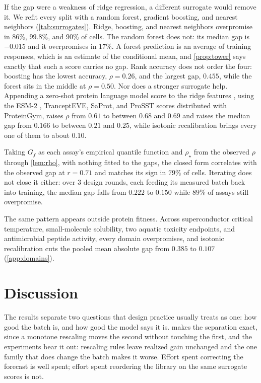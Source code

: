 \documentclass{article}
\theoremstyle{plain}
\theoremstyle{definition}
\begin{document}
If the gap were a weakness of ridge regression, a different surrogate would remove it.
We refit every split with a random forest, gradient boosting, and nearest neighbors
(\cref{tab:surrogates}). Ridge, boosting, and nearest neighbors overpromise in $86\%$,
$99.8\%$, and $90\%$ of cells. The random forest does not: its median gap is $-0.015$
and it overpromises in $17\%$. A forest prediction is an average of training responses,
which is an estimate of the conditional mean, and \cref{prop:tower} says exactly that
such a score carries no gap. Rank accuracy does not order the four: boosting has the
lowest accuracy, $\rho = 0.26$, and the largest gap, $0.455$, while the forest sits in
the middle at $\rho = 0.50$. Nor does a stronger surrogate help. Appending a zero-shot
protein language model score to the ridge features \citep{hsu2022learning}, using the
ESM-2 \citep{lin2023evolutionary}, TranceptEVE, SaProt, and ProSST scores distributed
with ProteinGym, raises $\rho$ from $0.61$ to between $0.68$ and $0.69$ and raises the
median gap from $0.166$ to between $0.21$ and $0.25$, while isotonic recalibration
brings every one of them to about $0.10$.

Taking $G_{\!f}$ as each assay's empirical quantile function and $\rho_\star$ from the
observed $\rho$ through \cref{lem:rho}, with nothing fitted to the gaps, the closed
form correlates with the observed gap at $r = 0.71$ and matches its sign in $79\%$ of
cells. Iterating does not close it either: over $3$ design rounds, each feeding its
measured batch back into training, the median gap falls from $0.222$ to $0.150$ while
$89\%$ of assays still overpromise.

The same pattern appears outside protein fitness. Across superconductor critical
temperature, small-molecule solubility, two aquatic toxicity endpoints, and
antimicrobial peptide activity, every domain overpromises, and isotonic recalibration
cuts the pooled mean absolute gap from $0.385$ to $0.107$
\mbox{(\cref{app:domains})}.

\section{Discussion}
\label{sec:discussion}

The results separate two questions that design practice usually treats as one: how good
the batch is, and how good the model says it is.  makes the
separation exact, since a monotone rescaling moves the second without touching the
first, and the experiments bear it out: rescaling rules leave realized gain unchanged
and the one family that does change the batch makes it worse. Effort spent correcting
the forecast is well spent; effort spent reordering the library on the same surrogate
scores is not.
\end{document}
